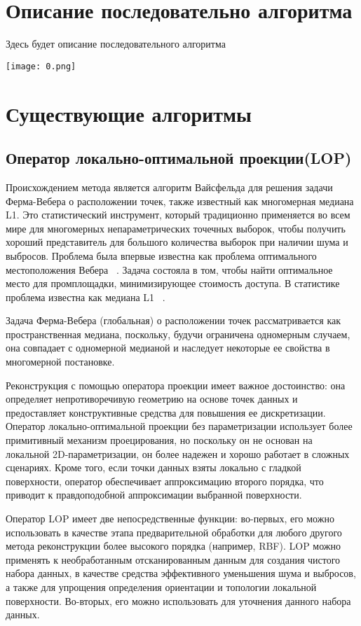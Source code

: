 

\section{Описание последовательно алгоритма}
Здесь будет описание последовательного алгоритма  

\texttt{[image: 0.png]}


\section{Существующие алгоритмы}
\subsection{Оператор локально-оптимальной проекции(LOP)}
Происхождением метода является алгоритм Вайсфельда для решения задачи Ферма-Вебера о расположении точек, также известный как многомерная медиана L1. Это статистический инструмент, который традиционно применяется во всем мире для многомерных непараметрических точечных выборок, чтобы получить хороший представитель для большого количества выборок при наличии шума и выбросов. Проблема была впервые известна как проблема оптимального местоположения Вебера ~\cite{WEBER}. Задача состояла в том, чтобы найти оптимальное место для промплощадки, минимизирующее стоимость доступа. В статистике проблема известна как медиана L1 ~\cite{BROWN, SMALL}.

Задача Ферма-Вебера (глобальная) о расположении точек рассматривается как пространственная медиана, поскольку, будучи ограничена одномерным случаем, она совпадает с одномерной медианой и наследует некоторые ее свойства в многомерной постановке.

Реконструкция с помощью оператора проекции имеет важное достоинство: она определяет непротиворечивую геометрию на основе точек данных и предоставляет конструктивные средства для повышения ее дискретизации. 
Оператор локально-оптимальной проекции без параметризации использует более примитивный механизм проецирования, но поскольку он не основан на локальной 2D-параметризации, он более надежен и хорошо работает в сложных сценариях. Кроме того, если точки данных взяты локально с гладкой поверхности, оператор обеспечивает аппроксимацию второго порядка, что приводит к правдоподобной аппроксимации выбранной поверхности.

Оператор LOP имеет две непосредственные функции: во-первых, его можно использовать в качестве этапа предварительной обработки для любого другого метода реконструкции более высокого порядка (например, RBF). LOP можно применять к необработанным отсканированным данным для создания чистого набора данных, в качестве средства эффективного уменьшения шума и выбросов, а также для упрощения определения ориентации и топологии локальной поверхности. Во-вторых, его можно использовать для уточнения данного набора данных.

